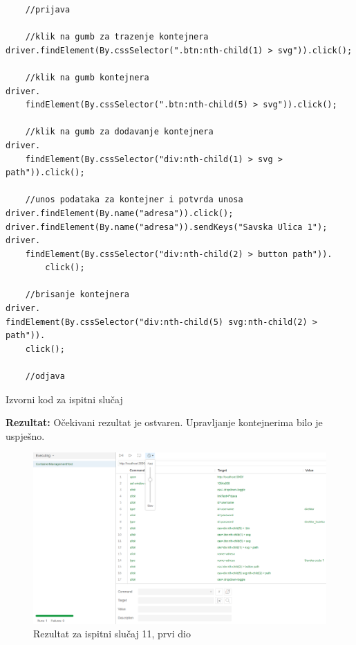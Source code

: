 		
\begin{verbatim}
    //prijava
 
    //klik na gumb za trazenje kontejnera
driver.findElement(By.cssSelector(".btn:nth-child(1) > svg")).click();

    //klik na gumb kontejnera    
driver.
    findElement(By.cssSelector(".btn:nth-child(5) > svg")).click();
    
    //klik na gumb za dodavanje kontejnera
driver.
    findElement(By.cssSelector("div:nth-child(1) > svg > path")).click();
    
    //unos podataka za kontejner i potvrda unosa
driver.findElement(By.name("adresa")).click();
driver.findElement(By.name("adresa")).sendKeys("Savska Ulica 1");
driver.
    findElement(By.cssSelector("div:nth-child(2) > button path")).
        click();
        
    //brisanje kontejnera 
driver.
findElement(By.cssSelector("div:nth-child(5) svg:nth-child(2) > path")).
    click();
    
    //odjava
\end{verbatim}

	\begin{listing}[H]
				\caption{Izvorni kod za ispitni slučaj \thetestcase}
				\label{test3}
			\end{listing}
			\noindent \textbf{Rezultat:} Očekivani rezultat je ostvaren. Upravljanje kontejnerima bilo je uspješno.  
			
			\begin{figure}[H]
            					\includegraphics[width=\linewidth]{slike/selenium/containermanagement.png}
            					\centering
            					\caption{Rezultat za ispitni slučaj 11, prvi dio}
            					\label{fig:test 11 p1}
            \end{figure}
            
